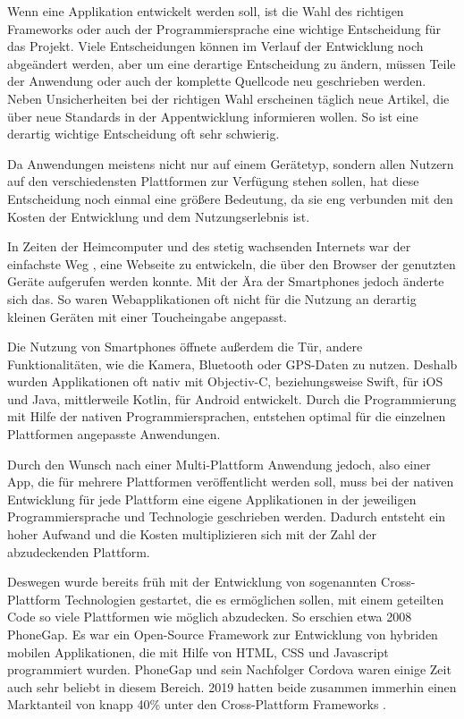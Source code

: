 Wenn eine Applikation entwickelt werden soll, ist die Wahl des richtigen Frameworks oder auch der Programmiersprache eine wichtige Entscheidung für das Projekt. Viele Entscheidungen können im Verlauf der Entwicklung noch abgeändert werden, aber um eine derartige Entscheidung zu ändern, müssen Teile der Anwendung oder auch der komplette Quellcode neu geschrieben werden. Neben Unsicherheiten bei der richtigen Wahl erscheinen täglich neue Artikel, die über neue Standards in der Appentwicklung informieren wollen. So ist eine derartig wichtige Entscheidung oft sehr schwierig.

Da Anwendungen meistens nicht nur auf einem Gerätetyp, sondern allen Nutzern auf den verschiedensten Plattformen zur Verfügung stehen sollen, hat diese Entscheidung noch einmal eine größere Bedeutung, da sie eng verbunden mit den Kosten der Entwicklung und dem Nutzungserlebnis ist.

In Zeiten der Heimcomputer und des stetig wachsenden Internets war der einfachste Weg , eine Webseite zu entwickeln, die über den Browser der genutzten Geräte aufgerufen werden konnte. Mit der Ära der Smartphones jedoch änderte sich das. So waren Webapplikationen oft nicht für die Nutzung an derartig kleinen Geräten mit einer Toucheingabe angepasst.

Die Nutzung von Smartphones öffnete außerdem die Tür, andere Funktionalitäten, wie die Kamera, Bluetooth oder GPS-Daten zu nutzen. Deshalb wurden Applikationen oft nativ mit Objectiv-C, beziehungsweise Swift, für iOS und Java, mittlerweile Kotlin, für Android entwickelt. Durch die Programmierung mit Hilfe der nativen Programmiersprachen, entstehen optimal für die einzelnen Plattformen angepasste Anwendungen.

Durch den Wunsch nach einer Multi-Plattform Anwendung jedoch, also einer App, die für mehrere Plattformen veröffentlicht werden soll, muss bei der nativen Entwicklung für jede Plattform eine eigene Applikationen in der jeweiligen Programmiersprache und Technologie geschrieben werden. Dadurch entsteht ein hoher Aufwand und die Kosten multiplizieren sich mit der Zahl der abzudeckenden Plattform.

Deswegen wurde bereits früh mit der Entwicklung von sogenannten Cross-Plattform Technologien gestartet, die es ermöglichen sollen, mit einem geteilten Code so viele Plattformen wie möglich abzudecken. So erschien etwa 2008 PhoneGap. Es war ein Open-Source Framework zur Entwicklung von hybriden mobilen Applikationen, die mit Hilfe von HTML, CSS und Javascript programmiert wurden. PhoneGap und sein Nachfolger Cordova waren einige Zeit auch sehr beliebt in diesem Bereich. 2019 hatten beide zusammen immerhin einen Marktanteil von knapp 40\% unter den Cross-Plattform Frameworks \cite{statist_CP_Framework}.

